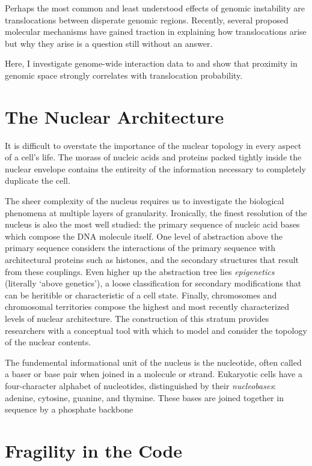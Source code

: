 \documentclass[phd,tocprelim]{cornell}
\begin{document}
Perhaps the most common and least understood effects of genomic instability are
translocations between disperate genomic regions.  Recently, several proposed
molecular mechanisms have gained traction in explaining how translocations arise
but why they arise is a question still without an answer.

Here, I investigate genome-wide interaction data to and show that proximity in
genomic space strongly correlates with translocation probability.

\chapter{The Nuclear Architecture}

It is difficult to overstate the importance of the nuclear topology in
every aspect of a cell's life.  The morass of nucleic acids and proteins
packed tightly inside the nuclear envelope contains the entireity of the
information necessary to completely duplicate the cell.

The sheer complexity of the nucleus requires us to investigate the biological
phenomena at multiple layers of granularity.  Ironically, the finest resolution
of the nucleus is also the most well studied: the primary sequence of nucleic
acid bases which compose the DNA molecule itself.  One level of abstraction
above the primary sequence considers the interactions of the primary sequence
with architectural proteins such as histones, and the secondary structures that
result from these couplings.  Even higher up the abstraction tree lies
\textit{epigenetics} (literally `above genetics'\cite{dictepi2014}), a loose
classification for secondary modifications that can be heritible or characteristic
of a cell state.  Finally, chromosomes and chromosomal territories compose the
highest and most recently characterized levels of nuclear architecture.  The
construction of this stratum provides researchers with a conceptual tool with
which to model and consider the topology of the nuclear contents.

The fundemental informational unit of the nucleus is the nucleotide, often
called a baser or base pair when joined in a molecule or strand.  Eukaryotic
cells have a four-character alphabet of nucleotides, distinguished by their
\textit{nucleobases}: adenine, cytosine, guanine, and thymine.  These bases
are joined together in sequence by a phosphate backbone




\chapter{Fragility in the Code}
\end{document}
